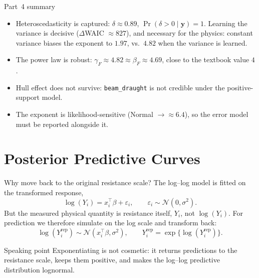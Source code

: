 \documentclass[11pt,aspectratio=169]{beamer}
\newcommand{\bF}{\ensuremath{\beta_F}}
\begin{document}
\begin{frame}{Part~4 summary}
	\small
	\begin{itemize}
		\item Heteroscedasticity is captured: $\delta\approx0.89$, $\Pr(\delta>0\mid\bm y)=1$.
		      Learning the variance is decisive ($\Delta$WAIC $\approx827$), and necessary for the
		      physics: constant variance biases the exponent to $1.97$, vs.\ $4.82$ when the variance is learned.
		\item The power law is robust: $\gamma_F\approx4.82\approx\bF\approx4.69$,
		      close to the textbook value $4$.
		\item Hull effect does not survive: \texttt{beam\_draught} is not credible
		      under the positive-support model.
		\item The exponent is likelihood-sensitive (Normal $\to\approx6.4$),
		      so the error model must be reported alongside it.
	\end{itemize}
\end{frame}


\section{Posterior Predictive Curves}
 
\begin{frame}{Why move back to the original resistance scale?}
	\small
	The log--log model is fitted on the transformed response,
	\[
		\log(Y_i)=x_i^{\top}\beta+\varepsilon_i,
		\qquad \varepsilon_i\sim\mathcal{N}(0,\sigma^2).
	\]
	But the measured physical quantity is resistance itself, $Y_i$, not $\log(Y_i)$.
	For prediction we therefore simulate on the log scale and transform back:
	\[
		\log(Y_i^{\mathrm{rep}})\sim\mathcal{N}(x_i^{\top}\beta,\sigma^2),
		\qquad
		Y_i^{\mathrm{rep}}=\exp\{\log(Y_i^{\mathrm{rep}})\}.
	\]
	\begin{block}{Speaking point}
		Exponentiating is not cosmetic: it returns predictions to the resistance scale,
		keeps them positive, and makes the log--log predictive distribution lognormal.
	\end{block}
\end{frame}
\end{document}
